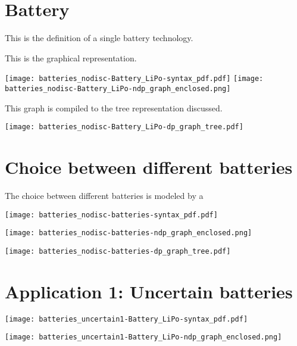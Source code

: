 \documentclass{article}
\begin{document}
\FloatBarrier
\clearpage

\section{Battery}

This is the definition of a single battery technology.

This is the graphical representation.

\texttt{[image: batteries\_nodisc-Battery\_LiPo-syntax\_pdf.pdf]}
% 
\texttt{[image: batteries\_nodisc-Battery\_LiPo-ndp\_graph\_enclosed.png]}

This graph is compiled to the tree representation discussed.

\texttt{[image: batteries\_nodisc-Battery\_LiPo-dp\_graph\_tree.pdf]}

\FloatBarrier
\clearpage

\section{Choice between different batteries}

The choice between different batteries is modeled by a 

\texttt{[image: batteries\_nodisc-batteries-syntax\_pdf.pdf]}

\texttt{[image: batteries\_nodisc-batteries-ndp\_graph\_enclosed.png]}

\texttt{[image: batteries\_nodisc-batteries-dp\_graph\_tree.pdf]}



\FloatBarrier
\clearpage

\section{Application 1: Uncertain batteries}

\texttt{[image: batteries\_uncertain1-Battery\_LiPo-syntax\_pdf.pdf]}


\FloatBarrier
\clearpage

\texttt{[image: batteries\_uncertain1-Battery\_LiPo-ndp\_graph\_enclosed.png]}

\end{document}
